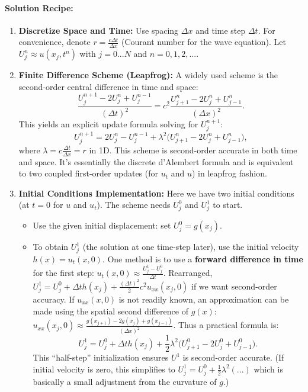 \documentclass[a4paper,11pt]{article}
\begin{document}
\paragraph{Solution Recipe:}
\begin{enumerate}
    \item \textbf{Discretize Space and Time:} Use spacing $\Delta x$ and time step $\Delta t$. For convenience, denote $r = \frac{c\Delta t}{\Delta x}$ (Courant number for the wave equation). Let $U_j^n \approx u(x_j, t^n)$ with $j=0...N$ and $n=0,1,2,...$.
    \item \textbf{Finite Difference Scheme (Leapfrog):} A widely used scheme is the second-order central difference in time and space:
          $$\frac{U_j^{n+1} - 2U_j^n + U_j^{n-1}}{(\Delta t)^2} = c^2 \frac{U_{j+1}^n - 2U_j^n + U_{j-1}^n}{(\Delta x)^2}.$$
          This yields an explicit update formula solving for $U_j^{n+1}$:
          $$U_j^{n+1} = 2U_j^n - U_j^{n-1} + \lambda^2\big(U_{j+1}^n - 2U_j^n + U_{j-1}^n\big),$$
          where $\lambda = c\frac{\Delta t}{\Delta x} = r$ in 1D. This scheme is second-order accurate in both time and space. It’s essentially the discrete d’Alembert formula and is equivalent to two coupled first-order updates (for $u_t$ and $u$) in leapfrog fashion.
    \item \textbf{Initial Conditions Implementation:} Here we have two initial conditions (at $t=0$ for $u$ and $u_t$). The scheme needs $U_j^0$ and $U_j^1$ to start.
          \begin{itemize}
              \item Use the given initial displacement: set $U_j^0 = g(x_j)$.
              \item To obtain $U_j^1$ (the solution at one time-step later), use the initial velocity $h(x) = u_t(x,0)$.
                    One method is to use a \textbf{forward difference in time} for the first step: $u_t(x,0) \approx \frac{U_j^1 - U_j^0}{\Delta t}$.
                    Rearranged, $U_j^1 = U_j^0 + \Delta th(x_j) + \frac{(\Delta t)^2}{2}c^2u_{xx}(x_j, 0)$ if we want second-order accuracy. If $u_{xx}(x,0)$ is not readily known, an approximation can be made using the spatial second difference of $g(x)$: $u_{xx}(x_j,0) \approx \frac{g(x_{j+1}) - 2g(x_j) + g(x_{j-1})}{(\Delta x)^2}$.
                    Thus a practical formula is:
                    $$U_j^1 = U_j^0 + \Delta th(x_j) + \frac{1}{2}\lambda^2 \big(U_{j+1}^0 - 2U_j^0 + U_{j-1}^0\big).$$
                    This “half-step” initialization ensures $U^1$ is second-order accurate. (If initial velocity is zero, this simplifies to $U_j^1 = U_j^0 + \frac{1}{2}\lambda^2(...)$ which is basically a small adjustment from the curvature of $g$.)

\end{itemize}
\end{enumerate}
\end{document}
